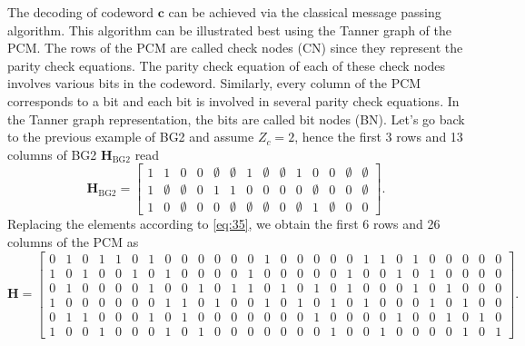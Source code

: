 \documentclass{article}
\def\c{\mathbf{c}}
\def\H{\mathbf{H}}
\def\Hbgt{\mathbf{H}_\mathrm{BG2}}
\def\Zc{{Z_c}}
\begin{document}
The decoding of codeword $\c$ can be achieved via the classical message passing algorithm. This algorithm can be illustrated best using the Tanner graph of the PCM. The rows of the PCM are called check nodes (CN) since they represent the parity check equations. The parity check equation of each of these check nodes involves various bits in the codeword. Similarly, every column of the PCM corresponds to a bit and each bit is involved in several parity check equations. In the Tanner graph representation, the bits are called bit nodes (BN). Let's go back to the previous example of BG2 and assume $\Zc=2$, hence the first 3 rows and 13 columns of BG2 $\Hbgt$ read
\begin{equation*}
  \label{eq:36}
  \Hbgt =
  \begin{bmatrix}
    1 & 1         & 0         & 0 & \emptyset & \emptyset & 1         & \emptyset & \emptyset & 1         & 0         & 0         & \emptyset & \emptyset \\
    1 & \emptyset & \emptyset & 0 & 1         & 1         & 0         & 0         & 0         & 0         & \emptyset & 0         & 0         & \emptyset \\
    1 & 0         & \emptyset & 0 & 0         & \emptyset & \emptyset & \emptyset & 0         & \emptyset & 1         & \emptyset & 0         & 0
  \end{bmatrix}.
\end{equation*}
Replacing the elements according to \eqref{eq:35}, we obtain the first 6 rows and 26 columns of the PCM as
\begin{equation*}
  \label{eq:39}
  \H =
  \begin{bmatrix}
    0 & 1 & 0 & 1 & 1 & 0 & 1 & 0 & 0 & 0 & 0 & 0 & 0 & 1 & 0 & 0 & 0 & 0 & 0 & 1 & 1 & 0 & 1 & 0 & 0 & 0 & 0 & 0\\
    1 & 0 & 1 & 0 & 0 & 1 & 0 & 1 & 0 & 0 & 0 & 0 & 1 & 0 & 0 & 0 & 0 & 0 & 1 & 0 & 0 & 1 & 0 & 1 & 0 & 0 & 0 & 0\\
    0 & 1 & 0 & 0 & 0 & 0 & 1 & 0 & 0 & 1 & 0 & 1 & 1 & 0 & 1 & 0 & 1 & 0 & 1 & 0 & 0 & 0 & 1 & 0 & 1 & 0 & 0 & 0\\
    1 & 0 & 0 & 0 & 0 & 0 & 0 & 1 & 1 & 0 & 1 & 0 & 0 & 1 & 0 & 1 & 0 & 1 & 0 & 1 & 0 & 0 & 0 & 1 & 0 & 1 & 0 & 0\\
    0 & 1 & 1 & 0 & 0 & 0 & 1 & 0 & 1 & 0 & 0 & 0 & 0 & 0 & 0 & 0 & 1 & 0 & 0 & 0 & 0 & 1 & 0 & 0 & 1 & 0 & 1 & 0\\
    1 & 0 & 0 & 1 & 0 & 0 & 0 & 1 & 0 & 1 & 0 & 0 & 0 & 0 & 0 & 0 & 0 & 1 & 0 & 0 & 1 & 0 & 0 & 0 & 0 & 1 & 0 & 1
  \end{bmatrix}.
\end{equation*}
\end{document}
